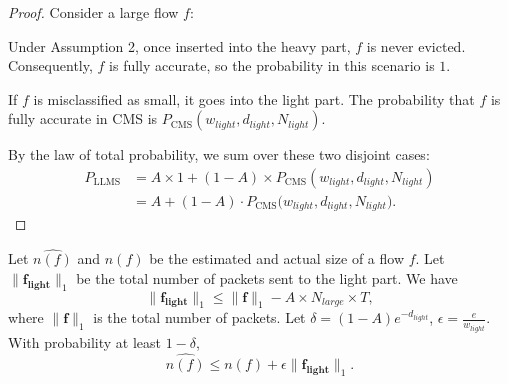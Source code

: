 \begin{proof}
Consider a large flow \(f\):

%
Under Assumption 2, once inserted into the heavy part, \(f\) is never evicted. Consequently, \(f\) is fully accurate, so the probability in this scenario is \(1\).

%
If \(f\) is misclassified as small, it goes into the light part.
The probability that \(f\) is fully accurate in CMS is \(P_{\mathrm{CMS}}(w_{light}, d_{light}, N_{light})\).

By the law of total probability, we sum over these two disjoint cases:
%
\begin{align*}
    P_{\mathrm{LLMS}}
    &= A \times 1 + (1 - A) \times P_{\mathrm{CMS}}(w_{light}, d_{light}, N_{light}) \\
    &= A + (1 - A) \cdot P_{\mathrm{CMS}} \bigl(w_{light}, d_{light}, N_{light}\bigr).
\end{align*}
\end{proof}






\begin{theorem}
\label{theorem:error_bound}
%
Let \(\hat{n(f)}\) and \(n(f)\) be the estimated and actual size of a flow \(f\).
%
Let \(\|\mathbf{f_{light}}\|_1\) be the total number of packets sent to the light part. We have
%
    \[\|\mathbf{f_{light}}\|_1 \leqslant \|\mathbf{f}\|_1 - A \times N_{large} \times T,
\]
%
where \(\|\mathbf{f}\|_1\) is the total number of packets.
%
Let \(\delta = (1 - A) e^{-d_{light}}\), \(\epsilon = \frac{e}{w_{light}}\).
%
With probability at least \(1 - \delta\), 
%
\[
    \hat{n(f)} \leqslant n(f) + \epsilon \|\mathbf{f_{light}}\|_1.
\]
%
\end{theorem}



